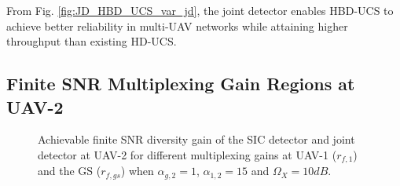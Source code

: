 From Fig. \ref{fig:JD_HBD_UCS_var_jd}, the joint detector enables HBD-UCS to achieve better reliability in multi-UAV networks while attaining higher throughput than existing HD-UCS.

\subsection{Finite SNR Multiplexing Gain Regions at UAV-2}

\begin{figure}[]
\centering
{}
\hfil
{}
\caption{Achievable finite SNR diversity gain of the SIC detector and joint detector at UAV-2 for different multiplexing gains at UAV-1 ($r_{f,1}$) and the GS ($r_{f,gs}$) when $\alpha_{g,2}=1$, $\alpha_{1,2}=15$ and $\Omega_X=10dB$.}
\label{fig:JD_HBD_UCS_var_mgr_surf_uav2}
\end{figure}


